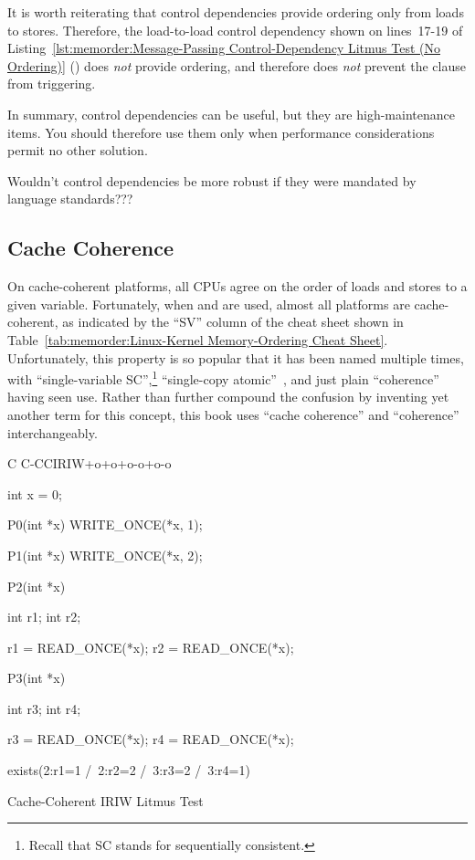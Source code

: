 It is worth reiterating that control dependencies provide ordering only
from loads to stores.
Therefore, the load-to-load control dependency shown on lines~17-19 of
Listing~\ref{lst:memorder:Message-Passing Control-Dependency Litmus Test (No Ordering)}
()
does \emph{not} provide ordering, and therefore does \emph{not}
prevent the  clause from triggering.

In summary, control dependencies can be useful, but they are
high-maintenance items.
You should therefore use them only when performance considerations
permit no other solution.

\QuickQuiz{}
	Wouldn't control dependencies be more robust if they were
	mandated by language standards???
 \QuickQuizEnd

\subsection{Cache Coherence}
\label{sec:memorder:Cache Coherence}

On cache-coherent platforms, all CPUs agree on the order of loads and
stores to a given variable.
Fortunately, when  and  are used,
almost all platforms are cache-coherent, as indicated by the ``SV''
column of the cheat sheet shown in
Table~\ref{tab:memorder:Linux-Kernel Memory-Ordering Cheat Sheet}.
Unfortunately, this property is so popular that it has been named
multiple times, with ``single-variable SC'',\footnote{
	Recall that SC stands for sequentially consistent.}
``single-copy atomic''~\cite{Stone:1995:SP:623262.623912},
and just plain ``coherence''~\cite{JadeAlglave2011ppcmem}
having seen use.
Rather than further compound the confusion by inventing yet another term
for this concept, this book uses ``cache coherence'' and ``coherence''
interchangeably.

\begin{listing}[tbp]
{ \scriptsize
\begin{verbbox}[\LstLineNo]
C C-CCIRIW+o+o+o-o+o-o

{
int x = 0;
}

P0(int *x)
{
  WRITE_ONCE(*x, 1);
}

P1(int *x)
{
  WRITE_ONCE(*x, 2);
}

P2(int *x)
{
  int r1;
  int r2;

  r1 = READ_ONCE(*x);
  r2 = READ_ONCE(*x);
}

P3(int *x)
{
  int r3;
  int r4;

  r3 = READ_ONCE(*x);
  r4 = READ_ONCE(*x);
}

exists(2:r1=1 /\ 2:r2=2 /\ 3:r3=2 /\ 3:r4=1)
\end{verbbox}
}
\centering
\theverbbox
\caption{Cache-Coherent IRIW Litmus Test}
\label{lst:memorder:Cache-Coherent IRIW Litmus Test}
\end{listing}

